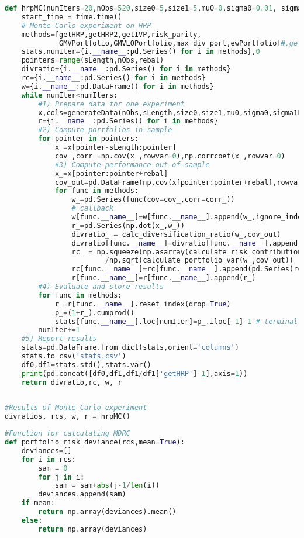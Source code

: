 \begin{lstlisting}[language=Python]
def hrpMC(numIters=20,nObs=520,size0=5,size1=5,mu0=0,sigma0=0.01, sigma1F=.25,sLength=260,rebal=22):
    start_time = time.time()
    # Monte Carlo experiment on HRP
    methods=[getHRP,getHRP2,getIVP,risk_parity,
             GMVPortfolio,GMVLOPortfolio,max_div_port,ewPortfolio]#,getCLA] 
    stats,numIter={i.__name__:pd.Series() for i in methods},0
    pointers=range(sLength,nObs,rebal)
    divratio={i.__name__:pd.Series() for i in methods}
    rc={i.__name__:pd.Series() for i in methods}
    w={i.__name__:pd.DataFrame() for i in methods}
    while numIter<numIters:
        #1) Prepare data for one experiment 
        x,cols=generateData(nObs,sLength,size0,size1,mu0,sigma0,sigma1F)
        r={i.__name__:pd.Series() for i in methods}
        #2) Compute portfolios in-sample
        for pointer in pointers:
            x_=x[pointer-sLength:pointer]
            cov_,corr_=np.cov(x_,rowvar=0),np.corrcoef(x_,rowvar=0) 
            #3) Compute performance out-of-sample
            x_=x[pointer:pointer+rebal]
            cov_out=pd.DataFrame(np.cov(x[pointer:pointer+rebal],rowvar=0))
            for func in methods:
                w_=pd.Series(func(cov=cov_,corr=corr_))
                # callback
                w[func.__name__]=w[func.__name__].append(w_,ignore_index=True)
                r_=pd.Series(np.dot(x_,w_))
                divratio_ = calc_diversification_ratio(w_,cov_out)
                divratio[func.__name__]=divratio[func.__name__].append(pd.Series(divratio_))
                rc_ = np.squeeze(np.asarray(calculate_risk_contribution(w_, cov_out)))
                        /np.sqrt(calculate_portfolio_var(w_,cov_out))
                rc[func.__name__]=rc[func.__name__].append(pd.Series(rc_))
                r[func.__name__]=r[func.__name__].append(r_)
        #4) Evaluate and store results
        for func in methods:
            r_=r[func.__name__].reset_index(drop=True)
            p_=(1+r_).cumprod()
            stats[func.__name__].loc[numIter]=p_.iloc[-1]-1 # terminal return
        numIter+=1
    #5) Report results
    stats=pd.DataFrame.from_dict(stats,orient='columns')
    stats.to_csv('stats.csv')
    df0,df1=stats.std(),stats.var()
    print(pd.concat([df0,df1,df1/df1['getHRP']-1],axis=1))
    return divratio,rc, w, r
        
\end{lstlisting}

\begin{lstlisting}[language=Python]
#Results of Monte Carlo experiment
divratios, rcs, w, r = hrpMC()
\end{lstlisting}

\begin{lstlisting}[language=Python]
#Function for calculating MDRC
def portfolio_risk_deviance(rcs,mean=True):
    deviances=[]
    for i in rcs:
        sam = 0
        for j in i:
            sam = sam+abs(j-1/len(i))
        deviances.append(sam)
    if mean:    
        return np.array(deviances).mean()
    else:
        return np.array(deviances)

\end{lstlisting}
